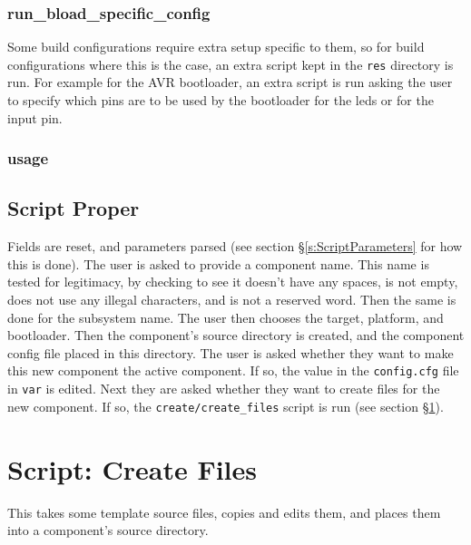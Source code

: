 \documentclass[a4paper, oneside, 11pt, titlepage, onecolumn, openright]{report}
\begin{document}
\subsubsection{run\_bload\_specific\_config}
			\label{sss:crecompRunBloadSpecificConfig}	
			Some build configurations require extra setup specific to them, so for build configurations where this is the case, an extra script kept in the \texttt{res} directory is run. For example for the AVR bootloader, an extra script is run asking the user to specify which pins are to be used by the bootloader for the leds or for the input pin.\newline
			
\subsubsection{usage}
			\label{sss:crecompUsage}
			
			
\subsection{Script Proper}
			\label{ss:crecompScriptProper}
			
			Fields are reset, and parameters parsed (see section \S\ref{s:ScriptParameters} for how this is done). \newline
			The user is asked to provide a component name. This name is tested for legitimacy, by checking to see it doesn't have any spaces, is not empty, does not use any illegal characters, and is not a reserved word. Then the same is done for the subsystem name.\newline
			The user then chooses the target, platform, and bootloader. Then the component's source directory is created, and the component config file placed in this directory.\newline
			The user is asked whether they want to make this new component the active component. If so, the value in the \texttt{config.cfg} file in \texttt{var} is edited.\newline
			Next they are asked whether they want to create files for the new component. If so, the \texttt{create/create\_files} script is run (see section \S\ref{s:createFiles}).
			
\section{Script: Create Files}
			\label{s:createFiles}
			This takes some template source files, copies and edits them, and places them into a component's source directory.
	
\end{document}
